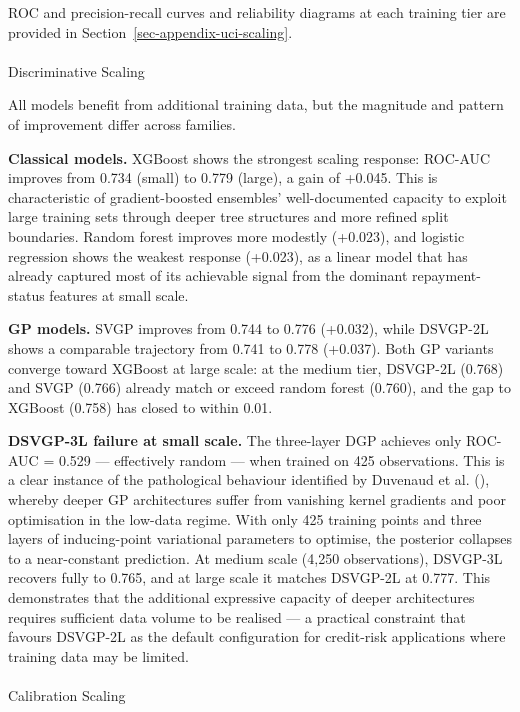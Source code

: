\documentclass[
  letterpaper,
  DIV=11,
  numbers=noendperiod]{scrartcl}
\makeatletter
\let\oldparagraph\paragraph
\renewcommand{\paragraph}{
    \@ifstar
      \xxxParagraphStar
      \xxxParagraphNoStar
  }
\newcommand{\xxxParagraphStar}[1]{\oldparagraph*{#1}\mbox{}}
\newcommand{\xxxParagraphNoStar}[1]{\oldparagraph{#1}\mbox{}}
\makeatother
\begin{document}
ROC and precision-recall curves and reliability diagrams at each
training tier are provided in Section~\ref{sec-appendix-uci-scaling}.

\paragraph{Discriminative Scaling}\label{discriminative-scaling}

All models benefit from additional training data, but the magnitude and
pattern of improvement differ across families.

\textbf{Classical models.} XGBoost shows the strongest scaling response:
ROC-AUC improves from 0.734 (small) to 0.779 (large), a gain of +0.045.
This is characteristic of gradient-boosted ensembles' well-documented
capacity to exploit large training sets through deeper tree structures
and more refined split boundaries. Random forest improves more modestly
(+0.023), and logistic regression shows the weakest response (+0.023),
as a linear model that has already captured most of its achievable
signal from the dominant repayment-status features at small scale.

\textbf{GP models.} SVGP improves from 0.744 to 0.776 (+0.032), while
DSVGP-2L shows a comparable trajectory from 0.741 to 0.778 (+0.037).
Both GP variants converge toward XGBoost at large scale: at the medium
tier, DSVGP-2L (0.768) and SVGP (0.766) already match or exceed random
forest (0.760), and the gap to XGBoost (0.758) has closed to within
0.01.

\textbf{DSVGP-3L failure at small scale.} The three-layer DGP achieves
only ROC-AUC = 0.529 --- effectively random --- when trained on 425
observations. This is a clear instance of the pathological behaviour
identified by Duvenaud et al.
(), whereby deeper GP
architectures suffer from vanishing kernel gradients and poor
optimisation in the low-data regime. With only 425 training points and
three layers of inducing-point variational parameters to optimise, the
posterior collapses to a near-constant prediction. At medium scale
(4,250 observations), DSVGP-3L recovers fully to 0.765, and at large
scale it matches DSVGP-2L at 0.777. This demonstrates that the
additional expressive capacity of deeper architectures requires
sufficient data volume to be realised --- a practical constraint that
favours DSVGP-2L as the default configuration for credit-risk
applications where training data may be limited.

\paragraph{Calibration Scaling}\label{calibration-scaling}
\end{document}
